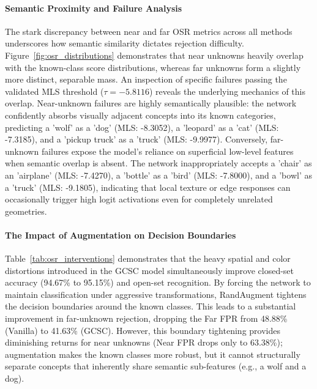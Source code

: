 \documentclass{article}
\begin{document}
\paragraph{Semantic Proximity and Failure Analysis}
The stark discrepancy between near and far OSR metrics across all methods underscores how semantic similarity dictates rejection difficulty. Figure~\ref{fig:osr_distributions} demonstrates that near unknowns heavily overlap with the known-class score distributions, whereas far unknowns form a slightly more distinct, separable mass. An inspection of specific failures passing the validated MLS threshold ($\tau = -5.8116$) reveals the underlying mechanics of this overlap. Near-unknown failures are highly semantically plausible: the network confidently absorbs visually adjacent concepts into its known categories, predicting a 'wolf' as a 'dog' (MLS: -8.3052), a 'leopard' as a 'cat' (MLS: -7.3185), and a 'pickup truck' as a 'truck' (MLS: -9.9977). Conversely, far-unknown failures expose the model's reliance on superficial low-level features when semantic overlap is absent. The network inappropriately accepts a 'chair' as an 'airplane' (MLS: -7.4270), a 'bottle' as a 'bird' (MLS: -7.8000), and a 'bowl' as a 'truck' (MLS: -9.1805), indicating that local texture or edge responses can occasionally trigger high logit activations even for completely unrelated geometries.

\paragraph{The Impact of Augmentation on Decision Boundaries}
Table~\ref{tab:osr_interventions} demonstrates that the heavy spatial and color distortions introduced in the GCSC model simultaneously improve closed-set accuracy (94.67\% to 95.15\%) and open-set recognition. By forcing the network to maintain classification under aggressive transformations, RandAugment tightens the decision boundaries around the known classes. This leads to a substantial improvement in far-unknown rejection, dropping the Far FPR from 48.88\% (Vanilla) to 41.63\% (GCSC). However, this boundary tightening provides diminishing returns for near unknowns (Near FPR drops only to 63.38\%); augmentation makes the known classes more robust, but it cannot structurally separate concepts that inherently share semantic sub-features (e.g., a wolf and a dog).
\end{document}
